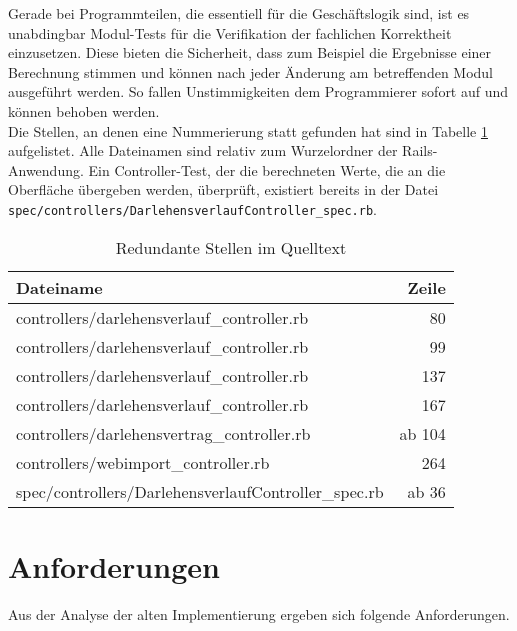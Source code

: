\documentclass[12pt]{scrreprt}
\begin{document}
Gerade bei Programmteilen, die essentiell für die Geschäftslogik sind, ist es unabdingbar Modul-Tests für die Verifikation der fachlichen Korrektheit einzusetzen. Diese bieten die Sicherheit, dass zum Beispiel die Ergebnisse einer Berechnung stimmen und können nach jeder Änderung am betreffenden Modul ausgeführt werden. So fallen Unstimmigkeiten dem Programmierer sofort auf und können behoben werden. \\ 

Die Stellen, an denen eine Nummerierung statt gefunden hat sind in Tabelle \ref{redundant} aufgelistet. Alle Dateinamen sind relativ zum Wurzelordner der Rails-Anwendung. Ein Controller-Test, der die berechneten Werte, die an die Oberfläche übergeben werden, überprüft, existiert bereits in der Datei 
\newline \verb+spec/controllers/DarlehensverlaufController_spec.rb+.

\begin{table}
  \begin{center}
    \begin{tabular}{|l|r|}
      \hline
      \textbf{Dateiname} & \textbf{Zeile}\\
      \hline
      controllers/darlehensverlauf\_controller.rb & 80\\
      \hline
      controllers/darlehensverlauf\_controller.rb & 99\\
      \hline
      controllers/darlehensverlauf\_controller.rb & 137\\
      \hline
      controllers/darlehensverlauf\_controller.rb & 167\\
      \hline
      controllers/darlehensvertrag\_controller.rb & ab 104\\
      \hline
      controllers/webimport\_controller.rb & 264\\
      \hline
      spec/controllers/DarlehensverlaufController\_spec.rb & ab 36\\
      \hline
    \end{tabular}
    \caption{Redundante Stellen im Quelltext}
    \label{redundant}
  \end{center}
\end{table}
\vspace{2mm}

\section{Anforderungen}
Aus der Analyse der alten Implementierung ergeben sich folgende Anforderungen.
\end{document}
